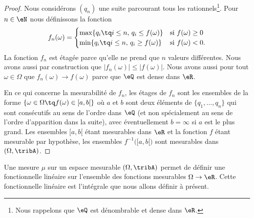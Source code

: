 \begin{proof}
    Nous considérons \( (q_n)\) une suite parcourant tous les rationnels\footnote{Nous rappelons que \( \eQ\) est dénombrable et dense dans \( \eR\).}.
    Pour \( n\in \eN\) nous définissons la fonction
    \begin{equation}
        f_n(\omega)=\begin{cases}
            \max\{ q_i\tq i\leq n,\, q_i\leq f(\omega) \}    &   \text{si \( f(\omega)\geq 0\)}\\
            \min\{ q_i\tq i\leq n,\, q_i\geq f(\omega) \}    &    \text{si \( f(\omega)< 0\).}
        \end{cases}
    \end{equation}
    La fonction \( f_n\) est étagée parce qu'elle ne prend que \( n\) valeurs différentes. Nous avons aussi par construction que \( | f_n(\omega)|\leq |f(\omega) |\). Nous avons aussi pour tout \( \omega\in \Omega\) que \( f_n(\omega)\to f(\omega)\) parce que \( \eQ\) est dense dans \( \eR\).

    En ce qui concerne la mesurabilité de \( f_n\), les étages de \( f_n\) sont les ensembles de la forme \( \{ \omega\in \Omega\tq f(\omega)\in\mathopen[ a , b [ \}\) où \( a\) et \( b\) sont deux éléments de \( \{ q_1,\ldots, q_n \}\) qui sont consécutifs au sens de l'ordre dans \( \eQ\) (et non spécialement au sens de l'ordre d'apparition dans la suite), avec éventuellement \( b=\infty\) si \( a\) est le plus grand. Les ensembles \( \mathopen[ a , b [\) étant mesurables dans \( \eR\) et la fonction \( f\) étant mesurable par hypothèse, les ensembles \( f^{-1}\Big( \mathopen[ a , b [ \Big)\) sont mesurables dans \( (\Omega,\tribA)\).
\end{proof}

Une mesure \( \mu\) sur un espace mesurable \( (\Omega,\tribA)\) permet de définir une fonctionnelle linéaire sur l'ensemble des fonctions mesurables \( \Omega\to \eR\). Cette fonctionnelle linéaire est l'intégrale que nous allons définir à présent.

